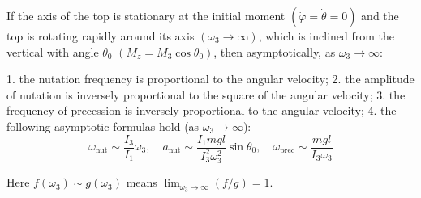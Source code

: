 If the axis of the top is stationary at the initial moment $(\dot{\varphi} = \dot{\theta} = 0)$ and the top is rotating rapidly around its axis $(\omega_3 \to \infty)$, which is inclined from the vertical with angle $\theta_0$ $(M_z = M_3 \cos \theta_0)$, then asymptotically, as $\omega_3 \to \infty$:

1. the nutation frequency is proportional to the angular velocity;
2. the amplitude of nutation is inversely proportional to the square of the angular velocity;
3. the frequency of precession is inversely proportional to the angular velocity;
4. the following asymptotic formulas hold (as $\omega_3 \to \infty$):
   $$\omega_{\text{nut}} \sim \frac{I_3}{I_1} \omega_3, \quad a_{\text{nut}} \sim \frac{I_1 m g l}{I_3^2 \omega_3^2} \sin \theta_0, \quad \omega_{\text{prec}} \sim \frac{m g l}{I_3 \omega_3}$$

Here $f(\omega_3) \sim g(\omega_3)$ means $\lim_{\omega_3 \to \infty} (f/g) = 1$.
